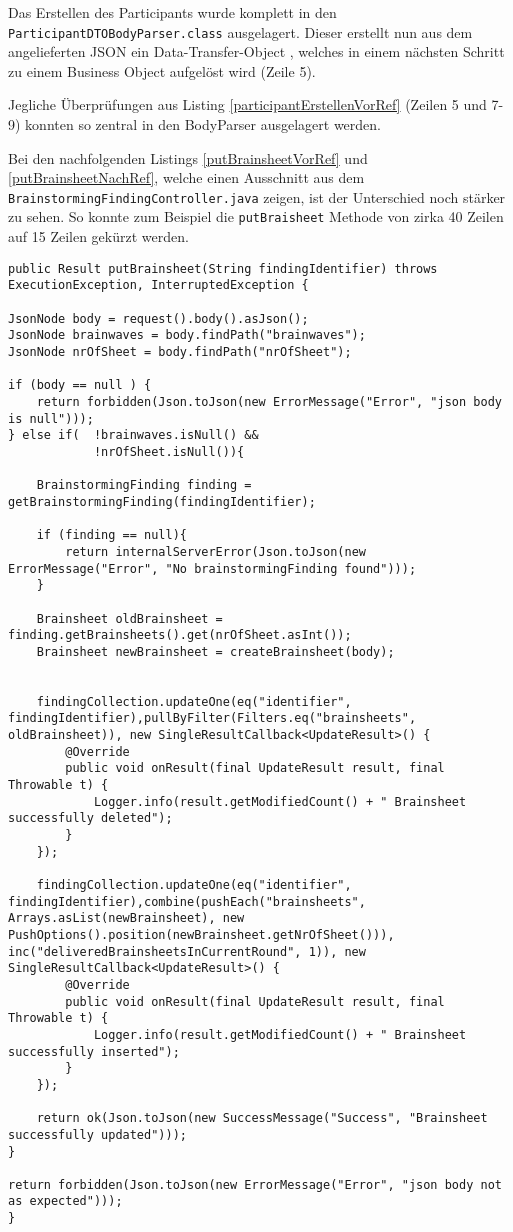 Das Erstellen des Participants wurde komplett in den \texttt{Participant\-DTO\-Body\-Parser\-.class} ausgelagert. Dieser erstellt nun aus dem angelieferten JSON ein Data-Transfer-Object \cite{DTO}, welches in einem nächsten Schritt zu einem Business Object aufgelöst wird (Zeile 5).

Jegliche Überprüfungen aus Listing \ref{participantErstellenVorRef} (Zeilen 5 und 7-9) konnten so zentral in den BodyParser ausgelagert werden.

Bei den nachfolgenden Listings \ref{putBrainsheetVorRef} und \ref{putBrainsheetNachRef}, welche einen Ausschnitt aus dem \texttt{Brain\-storming\-Finding\-Controller\-.java} zeigen, ist der Unterschied noch stärker zu sehen. So konnte zum Beispiel die \texttt{putBraisheet} Methode von zirka 40 Zeilen auf 15 Zeilen gekürzt werden. 

\begin{lstlisting}[caption={PutBrainsheet vor Refactoring}, label=putBrainsheetVorRef]
public Result putBrainsheet(String findingIdentifier) throws ExecutionException, InterruptedException {

JsonNode body = request().body().asJson();
JsonNode brainwaves = body.findPath("brainwaves");
JsonNode nrOfSheet = body.findPath("nrOfSheet");

if (body == null ) {
    return forbidden(Json.toJson(new ErrorMessage("Error", "json body is null")));
} else if(  !brainwaves.isNull() &&
            !nrOfSheet.isNull()){

	BrainstormingFinding finding = getBrainstormingFinding(findingIdentifier);

    if (finding == null){
        return internalServerError(Json.toJson(new ErrorMessage("Error", "No brainstormingFinding found")));
    }

    Brainsheet oldBrainsheet = finding.getBrainsheets().get(nrOfSheet.asInt());
    Brainsheet newBrainsheet = createBrainsheet(body);


    findingCollection.updateOne(eq("identifier", findingIdentifier),pullByFilter(Filters.eq("brainsheets", oldBrainsheet)), new SingleResultCallback<UpdateResult>() {
        @Override
        public void onResult(final UpdateResult result, final Throwable t) {
            Logger.info(result.getModifiedCount() + " Brainsheet successfully deleted");
        }
    });

    findingCollection.updateOne(eq("identifier", findingIdentifier),combine(pushEach("brainsheets", Arrays.asList(newBrainsheet), new PushOptions().position(newBrainsheet.getNrOfSheet())), inc("deliveredBrainsheetsInCurrentRound", 1)), new SingleResultCallback<UpdateResult>() {
        @Override
        public void onResult(final UpdateResult result, final Throwable t) {
            Logger.info(result.getModifiedCount() + " Brainsheet successfully inserted");
        }
    });

    return ok(Json.toJson(new SuccessMessage("Success", "Brainsheet successfully updated")));
}

return forbidden(Json.toJson(new ErrorMessage("Error", "json body not as expected")));
}
\end{lstlisting}


